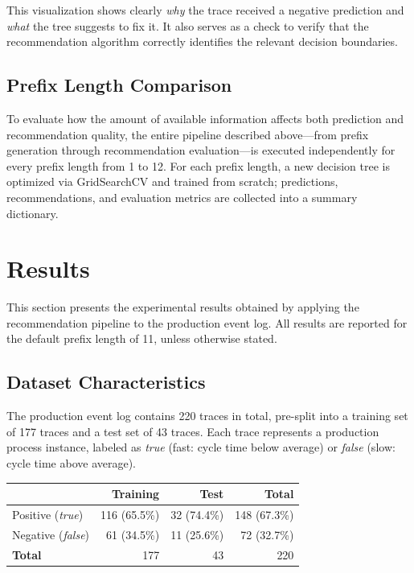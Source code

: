 \documentclass{article}
\begin{document}
\noindent
This visualization shows clearly \textit{why} the trace received a negative prediction and \textit{what} the tree suggests to fix it. It also serves as a check to verify that the recommendation algorithm correctly identifies the relevant decision boundaries.


\subsection{Prefix Length Comparison}

To evaluate how the amount of available information affects both prediction and recommendation quality, the entire pipeline described above---from prefix generation through recommendation evaluation---is executed independently for every prefix length from 1 to 12. For each prefix length, a new decision tree is optimized via GridSearchCV and trained from scratch; predictions, recommendations, and evaluation metrics are collected into a summary dictionary.


\section{Results}

This section presents the experimental results obtained by applying the recommendation pipeline to the production event log. All results are reported for the default prefix length of 11, unless otherwise stated.

\subsection{Dataset Characteristics}

The production event log contains 220 traces in total, pre-split into a training set of 177 traces and a test set of 43 traces. Each trace represents a production process instance, labeled as \textit{true} (fast: cycle time below average) or \textit{false} (slow: cycle time above average).

\begin{center}
\begin{tabular}{lrrr}
\toprule
& \textbf{Training} & \textbf{Test} & \textbf{Total} \\
\midrule
Positive (\textit{true})  & 116 (65.5\%) & 32 (74.4\%) & 148 (67.3\%) \\
Negative (\textit{false}) &  61 (34.5\%) & 11 (25.6\%) &  72 (32.7\%) \\
\midrule
\textbf{Total}            & 177          & 43          & 220          \\
\bottomrule
\end{tabular}
\end{center}
\end{document}
